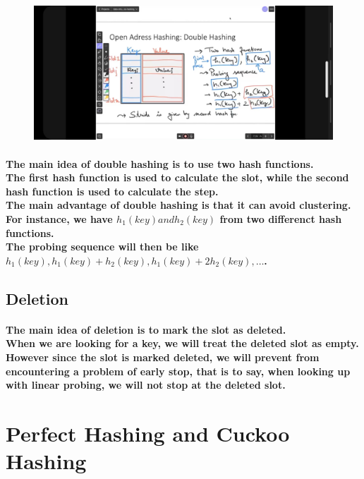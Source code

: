 \documentclass{article}
\begin{document}
 \begin{figure}[H]
    \includegraphics[width=\textwidth]{doublehashing.jpg}
\end{figure}

\paragraph{The main idea of double hashing is to use two hash functions.\\
The first hash function is used to calculate the slot, while the second hash function is 
used to calculate the step.\\
The main advantage of double hashing is that it can avoid clustering.\\
For instance, we have $h_1(key) and h_2(key)$ from two differenct hash functions.\\
The probing sequence will then be like $h_1(key), h_1(key)+h_2(key), h_1(key)+2h_2(key), \ldots$.\\}


\subsection{Deletion}

\paragraph{The main idea of deletion is to mark the slot as deleted.\\
When we are looking for a key, we will treat the deleted slot as empty.\\
However since the slot is marked deleted, we will prevent from encountering a problem of early stop,
that is to say, when looking up with linear probing, we will not stop at the deleted slot.\\}

\section{Perfect Hashing and Cuckoo Hashing}
\end{document}
